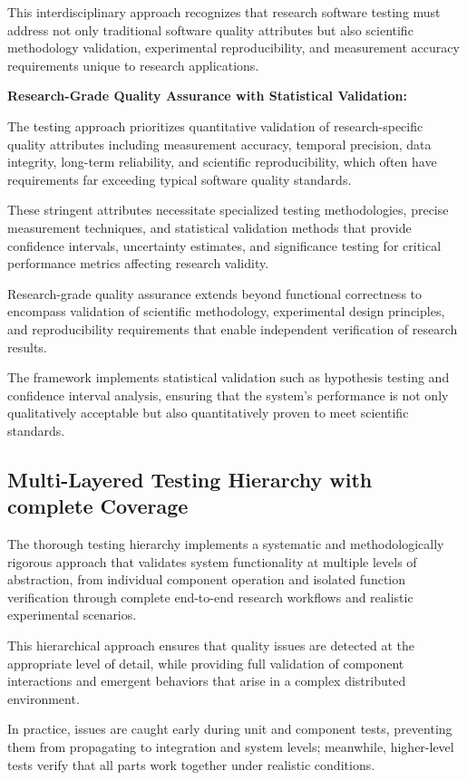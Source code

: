 This interdisciplinary approach recognizes that research software testing must
address not only traditional software quality attributes but also scientific
methodology validation, experimental reproducibility, and measurement accuracy
requirements unique to research applications.

\textbf{Research-Grade Quality Assurance with Statistical Validation:}

The testing approach prioritizes quantitative validation of research-specific quality
attributes including measurement accuracy, temporal precision, data integrity,
long-term reliability, and scientific reproducibility, which often have requirements
far exceeding typical software quality standards.

These stringent attributes necessitate specialized testing methodologies, precise
measurement techniques, and statistical validation methods that provide confidence
intervals, uncertainty estimates, and significance testing for critical performance
metrics affecting research validity.

Research-grade quality assurance extends beyond functional correctness to encompass
validation of scientific methodology, experimental design principles, and
reproducibility requirements that enable independent verification of research
results.

The framework implements statistical validation such as hypothesis
testing and confidence interval analysis, ensuring that the system's performance is
not only qualitatively acceptable but also quantitatively proven to meet scientific
standards.

\subsection{Multi-Layered Testing Hierarchy with complete Coverage}

The thorough testing hierarchy implements a systematic and methodologically rigorous
approach that validates system functionality at multiple levels of abstraction, from
individual component operation and isolated function verification through complete
end-to-end research workflows and realistic experimental scenarios.

This hierarchical approach ensures that quality issues are detected at the
appropriate level of detail, while providing full validation of component
interactions and emergent behaviors that arise in a complex distributed environment.

In practice, issues are caught early during unit and component tests, preventing them
from propagating to integration and system levels; meanwhile, higher-level tests
verify that all parts work together under realistic conditions.

